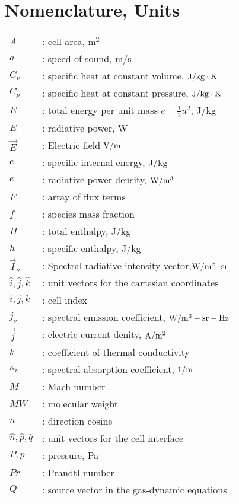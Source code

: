 \documentclass[12pt,a4paper,twoside]{article}
\begin{document}
\section*{Nomenclature, Units}
%
\begin{tabular}{ll}
$A$	& : cell area, m$^2$ \\
$a$	& : speed of sound, m/s \\
$C_v$	& : specific heat at constant volume, $\rm J/kg \cdot K$ \\
$C_p$	& : specific heat at constant pressure, $\rm J/kg \cdot K$ \\
$E$	& : total energy per unit mass $e + \frac{1}{2} u^2$, J/kg \\
$E$  & : radiative power, W \\
$\vec{E}$   & : Electric field $\rm V/m$ \\ 
$e$	& : specific internal energy, J/kg \\
$e$  & : radiative power density, $\rm W/m^3$ \\
$\overline{F}$ & : array of flux terms \\
$f$            & : species mass fraction \\
$H$	& : total enthalpy, J/kg \\
$h$            & : specific enthalpy, J/kg \\
$\vec{I}_\nu$     & : Spectral radiative intensity vector,$\rm W/m^2 \cdot sr$ \\
$\hat{i}, 
 \hat{j},
 \hat{k}$      & : unit vectors for the cartesian coordinates \\
$i,j,k$	& : cell index \\
$j_\nu$     & : spectral emission coefficient, $\rm W/m^3-sr-Hz$ \\
$\vec{j}$   & : electric current denity, $\rm A/m^2$ \\ 
$k$            & : coefficient of thermal conductivity \\
$\kappa_\nu$ & : spectral absorption coefficient, $\rm 1/m$ \\
$M$	& : Mach number \\
$MW$	& : molecular weight \\
$n$            & : direction cosine \\
$\hat{n}, 
 \hat{p},
 \hat{q}$      & : unit vectors for the cell interface \\
$P, p$	& : pressure, Pa \\
$Pr$	& : Prandtl number \\
$Q$	& : source vector in the gas-dynamic equations \\

\end{tabular}
\end{document}

